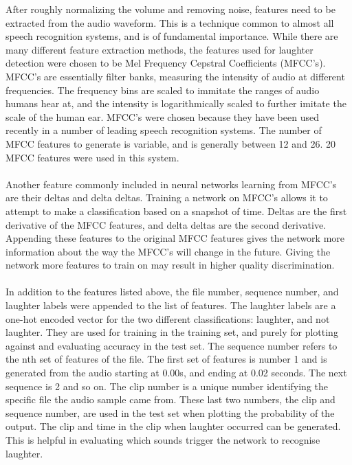 \documentclass[a4paper,11pt,notitlepage]{article}
\begin{document}
After roughly normalizing the volume and removing noise, features need to be extracted from the audio waveform. This is a technique common to almost all speech recognition systems, and is of fundamental importance. 
While there are many different feature extraction methods, the features used for laughter detection were chosen to be Mel Frequency Cepstral Coefficients (MFCC's). MFCC's are essentially filter banks, measuring the intensity of audio at different frequencies. The frequency bins are scaled to immitate the ranges of audio humans hear at, and the intensity is logarithmically scaled to further imitate the scale of the human ear. MFCC's were chosen because they have been used recently in a number of leading speech recognition systems.\cite{mozilladeepspeech} The number of MFCC features to generate is variable, and is generally between 12 and 26. 20 MFCC features were used in this system.\\
\\
Another feature commonly included in neural networks learning from MFCC's are their deltas and delta deltas. Training a network on MFCC's allows it to attempt to make a classification based on a snapshot of time. Deltas are the first derivative of the MFCC features, and delta deltas are the second derivative. Appending these features to the original MFCC features gives the network more information about the way the MFCC's will change in the future. Giving the network more features to train on may result in higher quality discrimination.\\
\\
In addition to the features listed above, the file number, sequence number, and laughter labels were appended to the list of features. The laughter labels are a one-hot encoded vector for the two different classifications: laughter, and not laughter. They are used for training in the training set, and purely for plotting against and evaluating accuracy in the test set. The sequence number refers to the nth set of features of the file. The first set of features is number 1 and is generated from the audio starting at 0.00s, and ending at 0.02 seconds. The next sequence is 2 and so on. The clip number is a unique number identifying the specific file the audio sample came from. These last two numbers, the clip and sequence number, are used in the test set when plotting the probability of the output. The clip and time in the clip when laughter occurred can be generated. This is helpful in evaluating which sounds trigger the network to recognise laughter.\\
\end{document}
